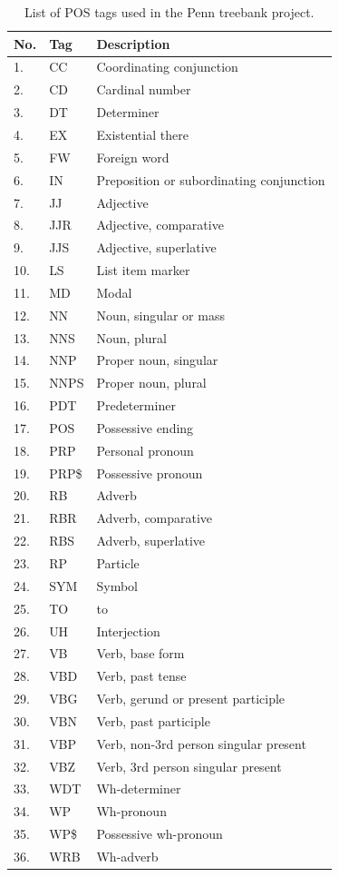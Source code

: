 \begin{table}[t]
\centering
\begin{tabular}{| l | l | l |} 
\hline
    No. & Tag & Description \\
\hline
    1. & CC & Coordinating conjunction \\
    2. & CD & Cardinal number \\
    3. & DT & Determiner \\
    4. & EX & Existential there \\
    5. & FW & Foreign word \\
    6. & IN & Preposition or subordinating conjunction \\
    7. & JJ & Adjective \\
    8. & JJR & Adjective, comparative \\
    9. & JJS & Adjective, superlative \\
    10. & LS & List item marker \\
    11. & MD & Modal \\
    12. & NN & Noun, singular or mass \\
    13. & NNS & Noun, plural \\
    14. & NNP & Proper noun, singular \\
    15. & NNPS & Proper noun, plural \\
    16. & PDT & Predeterminer \\
    17. & POS & Possessive ending \\
    18. & PRP & Personal pronoun \\
    19. & PRP\$ & Possessive pronoun \\
    20. & RB & Adverb \\
    21. & RBR & Adverb, comparative \\
    22. & RBS & Adverb, superlative \\
    23. & RP & Particle \\
    24. & SYM & Symbol \\
    25. & TO & to \\
    26. & UH & Interjection \\
    27. & VB & Verb, base form \\
    28. & VBD & Verb, past tense \\
    29. & VBG & Verb, gerund or present participle \\
    30. & VBN & Verb, past participle \\
    31. & VBP & Verb, non-3rd person singular present \\
    32. & VBZ & Verb, 3rd person singular present \\
    33. & WDT & Wh-determiner \\
    34. & WP & Wh-pronoun \\
    35. & WP\$ & Possessive wh-pronoun \\
    36. & WRB & Wh-adverb \\
\hline
\end{tabular}
\caption{List of POS tags used in the Penn treebank project.}
\label{tab:penn-pos}
\end{table}

